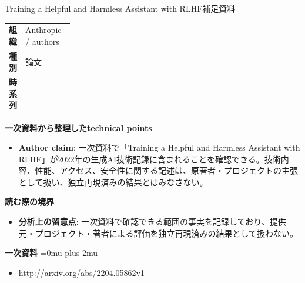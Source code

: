 \begin{technicalnote}{Training a Helpful and Harmless Assistant with RLHF}{補足資料}
\begingroup
\begin{tabularx}{\linewidth}{@{}>{\bfseries}p{0.22\linewidth}X@{}}
組織 & Anthropic / authors \\
種別 & 論文 \\
時系列 & — \\
\end{tabularx}
\smallskip
{\bfseries 一次資料から整理したtechnical points}
\begin{itemize}[leftmargin=1.5em,itemsep=0.35em]
\item \textbf{Author claim}: 一次資料で「Training a Helpful and Harmless Assistant with RLHF」が2022年の生成AI技術記録に含まれることを確認できる。技術内容、性能、アクセス、安全性に関する記述は、原著者・プロジェクトの主張として扱い、独立再現済みの結果とはみなさない。
\end{itemize}
\begin{minipage}{\linewidth}
{\bfseries 読む際の境界}
\begin{itemize}[leftmargin=1.5em,itemsep=0.35em]
\item \textbf{分析上の留意点}: 一次資料で確認できる範囲の事実を記録しており、提供元・プロジェクト・著者による評価を独立再現済みの結果として扱わない。
\end{itemize}
\begin{samepage}
{\bfseries 一次資料}
\begingroup\sloppy
\Urlmuskip=0mu plus 2mu\relax
\begin{itemize}[leftmargin=1.5em,itemsep=0.25em]
\item {\scriptsize\url{http://arxiv.org/abs/2204.05862v1}}
\end{itemize}
\endgroup
\end{samepage}
\end{minipage}
\endgroup
\end{technicalnote}
\medskip

